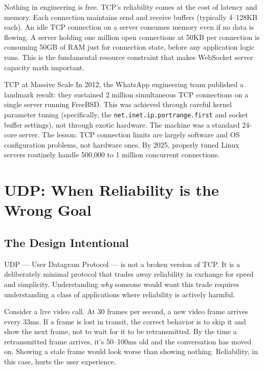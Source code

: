 \documentclass[11pt,a4paper]{article}
\begin{document}
Nothing in engineering is free. TCP's reliability comes at the cost of latency and memory. Each connection maintains send and receive buffers (typically 4--128KB each). An idle TCP connection on a server consumes memory even if no data is flowing. A server holding one million open connections at 50KB per connection is consuming 50GB of RAM just for connection state, before any application logic runs. This is the fundamental resource constraint that makes WebSocket server capacity math important.

\begin{industrybox}{TCP at Massive Scale}
In 2012, the WhatsApp engineering team published a landmark result: they sustained 2 million simultaneous TCP connections on a single server running FreeBSD. This was achieved through careful kernel parameter tuning (specifically, the \texttt{net.inet.ip.portrange.first} and socket buffer settings), not through exotic hardware. The machine was a standard 24-core server. The lesson: TCP connection limits are largely software and OS configuration problems, not hardware ones. By 2025, properly tuned Linux servers routinely handle 500,000 to 1 million concurrent connections.
\end{industrybox}

\section{UDP: When Reliability is the Wrong Goal}

\subsection{The Design Intentional}

UDP --- User Datagram Protocol --- is not a broken version of TCP. It is a deliberately minimal protocol that trades away reliability in exchange for speed and simplicity. Understanding \emph{why} someone would want this trade requires understanding a class of applications where reliability is actively harmful.

Consider a live video call. At 30 frames per second, a new video frame arrives every 33ms. If a frame is lost in transit, the correct behavior is to skip it and show the next frame, not to wait for it to be retransmitted. By the time a retransmitted frame arrives, it's 50--100ms old and the conversation has moved on. Showing a stale frame would look worse than showing nothing. Reliability, in this case, hurts the user experience.
\end{document}
